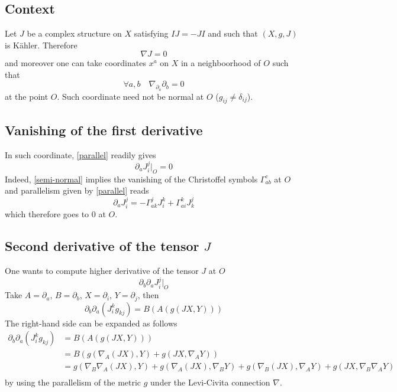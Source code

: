 \documentclass[11pt,makeidx]{amsart}%
\title{}
\numberwithin{equation}{subsection}
\begin{document}
\section{}
\subsection{Context} Let $J$ be a complex structure on $X$ satisfying $IJ=-JI$ and such that $(X,g,J)$ is Kähler. Therefore 
\begin{equation}\label{parallel}
\nabla J = 0
\end{equation}
and moreover one can take coordinates $x^a$ on $X$ in a neighboorhood of $O$ such that
\begin{equation}\label{semi-normal}
\forall a, b \quad 
\nabla_{\partial_a} \partial_b = 0
\end{equation}
at the point $O$. Such coordinate need not be normal at $O$ ($g_{ij} \neq \delta_{ij}$).
\subsection{Vanishing of the first derivative} In such coordinate, \eqref{parallel} readily gives
\begin{equation}\label{first_derivative}
\partial_a J^j_i |_O = 0
\end{equation}
Indeed, \eqref{semi-normal} implies the vanishing of the Christoffel symbols $\Gamma^c_{ab}$ at $O$ and parallelism given by \eqref{parallel} reads
\begin{equation}
\partial_a J^j_i = - \Gamma^j_{ak} J^k_i + \Gamma^k_{ai} J^j_k
\end{equation}
which therefore goes to $0$ at $O$.
\subsection{Second derivative of the tensor $J$} One wants to compute higher derivative of the tensor $J$ at $O$
\begin{equation}\label{second_derivative}
\partial_b  \partial_a J_i^j \vert_O
\end{equation}
Take $A = \partial_a$, $B= \partial_b$, $X=\partial_i$, $Y = \partial_j$, then
\begin{equation}
\partial_b \partial_a \left( J^k_i g_{kj} \right) = B\left( A \left( g\left( JX, Y \right) \right) \right)
\end{equation}
The right-hand side can be expanded as follows
\begin{align*}
\partial_b \partial_a \left( J^k_i g_{kj} \right) &= B\left( A \left( g\left( JX, Y \right) \right) \right) \\
&= B\left( g\left( \nabla_A(JX), Y \right) +  g\left(JX, \nabla_AY \right)\right) \\
&= g\left( \nabla_B\nabla_A(JX), Y \right) 
	+ g\left( \nabla_A(JX), \nabla_BY \right) 
	+  g\left(\nabla_B(JX), \nabla_AY \right)
	+  g\left(JX, \nabla_B\nabla_AY \right) \\
\end{align*}
by using the parallelism of the metric $g$ under the Levi-Civita connection $\nabla$.
\end{document}
